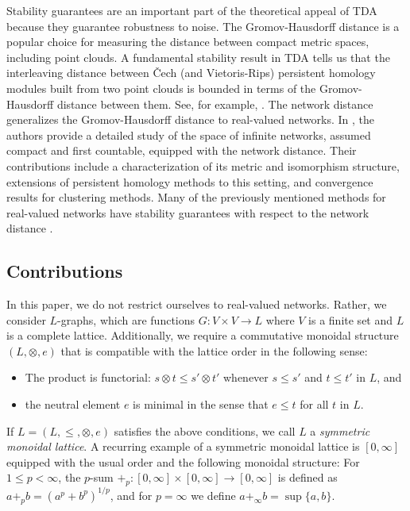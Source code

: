 \documentclass[a4paper,11pt]{article}
\newcommand{\tensor}{\otimes}
\theoremstyle{remark}
\begin{document}
Stability guarantees are an important part of the  theoretical appeal of TDA because they guarantee robustness to noise. The Gromov-Hausdorff distance is a popular choice for measuring the distance between compact metric spaces, including point clouds. A fundamental stability result in TDA tells us that the interleaving distance between \v{C}ech (and Vietoris-Rips) persistent homology modules built from two point clouds is bounded in terms of the Gromov-Hausdorff distance between them. See, for example, \cite[Section~5.7]{chazal2021introduction}. The network distance \cite{carlsson2013axiomatic,carlsson2014hierarchical,chowdhury2016distances,chowdhury2023distances} generalizes the Gromov-Hausdorff distance to real-valued networks. In \cite{chowdhury2023distances}, the authors provide a detailed study of the space of infinite networks, assumed compact and first countable, equipped with the network distance. Their contributions include a characterization of its metric and isomorphism structure, extensions of persistent homology methods to this setting, and convergence results for clustering methods. Many of the previously mentioned methods for real-valued networks have stability guarantees with respect to the network distance \cite{turner2019rips,chowdhury2018functorial,chowdhury2018persistent,mendez2023directed,ivanov2024ell_p}.%

\subsection*{Contributions}

In this paper, we do not restrict ourselves to real-valued networks. Rather, we consider $L$-graphs, which are functions $G\colon V\times V\to L$ where $V$ is a finite set and $L$ is a complete lattice. Additionally, we require a commutative monoidal structure $(L,\tensor,e)$ that is compatible with the lattice order in the following sense:
\begin{itemize}
    \item The product is functorial: $s\tensor t\leq s'\tensor t'$ whenever $s\leq s'$ and $t\leq t'$ in $L$, and
    \item the neutral element $e$ is minimal in the sense that $e\leq t$ for all $t$ in $L$.
\end{itemize}
If $L=(L,\leq,\tensor,e)$ satisfies the above conditions, we call $L$ a \emph{symmetric monoidal lattice}. A recurring example of a symmetric monoidal lattice is $[0,\infty]$ equipped with the usual order and the following monoidal structure: For $1\leq p<\infty$, the $p$-sum $+_p\colon [0,\infty]\times [0,\infty]\to [0,\infty]$ is defined as $a+_p b=(a^p+b^p)^{1/p}$, and for $p=\infty$ we define $a+_\infty b=\sup\{a,b\}$.
\end{document}
